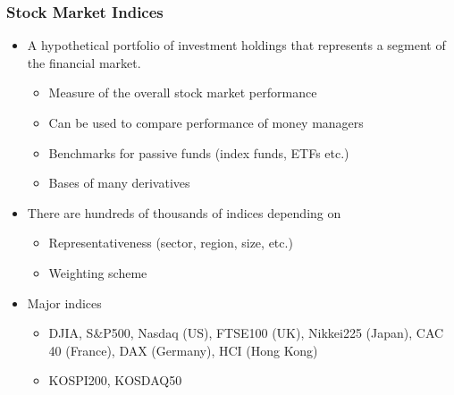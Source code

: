 \documentclass[10pt]{beamer}
\begin{document}
	
	\begin{frame}
		\frametitle{Stock Market Indices}
		
		\begin{itemize} \vspace{5pt} \itemsep10pt
			\item A hypothetical portfolio of investment holdings that represents a segment of the financial market.	
			\begin{itemize}
				\item Measure of the overall stock market performance
				\item Can be used to compare performance of money managers
				\item Benchmarks for passive funds (index funds, ETFs etc.)
				\item Bases of many derivatives
			\end{itemize}
			
			\item There are hundreds of thousands of indices depending on
			\begin{itemize}
				\item Representativeness (sector, region, size, etc.)
				\item Weighting scheme
			\end{itemize}
			
			\item Major indices
			\begin{itemize}
				\item DJIA, S\&P500, Nasdaq (US), FTSE100 (UK), Nikkei225 (Japan), CAC 40 (France), DAX (Germany), HCI (Hong Kong)
				\item KOSPI200, KOSDAQ50
			\end{itemize}
		\end{itemize}
		
	\end{frame}
	
	
	
\end{document}
